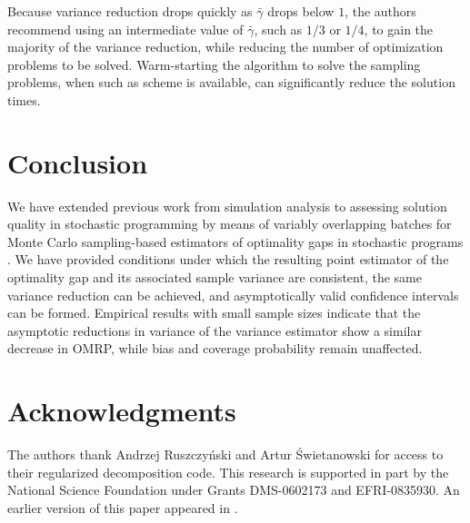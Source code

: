 \documentclass{article}
\newcommand{\gammab}{\bar{\gamma}}
\begin{document}
Because variance reduction drops quickly as $\gammab$ drops below $1$, the authors recommend using an intermediate value of $\gammab$, such as $1/3$ or $1/4$, to gain the majority of the variance reduction, while reducing the number of optimization problems to be solved. 
Warm-starting the algorithm to solve the sampling problems, when such as scheme is available, can significantly reduce the solution times.


\section{Conclusion} \label{sec:concl}
We have extended previous work from simulation analysis to assessing solution quality in stochastic programming by means of variably overlapping batches \cite{Meketon1984,Song1992,Welch1987} for Monte Carlo sampling-based estimators of optimality gaps in stochastic programs \cite{Mak1999}. 
We have provided conditions under which the resulting point estimator of the optimality gap and its associated sample variance are consistent, the same variance reduction can be achieved, and asymptotically valid confidence intervals can be formed. 
Empirical results with small sample sizes indicate that the asymptotic reductions in variance of the variance estimator show a similar decrease in OMRP, while bias and coverage probability remain unaffected. 


\section*{Acknowledgments}
The authors thank Andrzej Ruszczy{\'{n}}ski and Artur {\'{S}}wietanowski for
access to their regularized decomposition code. 
This research is supported
in part by the National Science Foundation under Grants DMS-0602173 and
EFRI-0835930.  
An earlier version of this paper appeared in \cite{love2011overlapping}.




 

\end{document}
